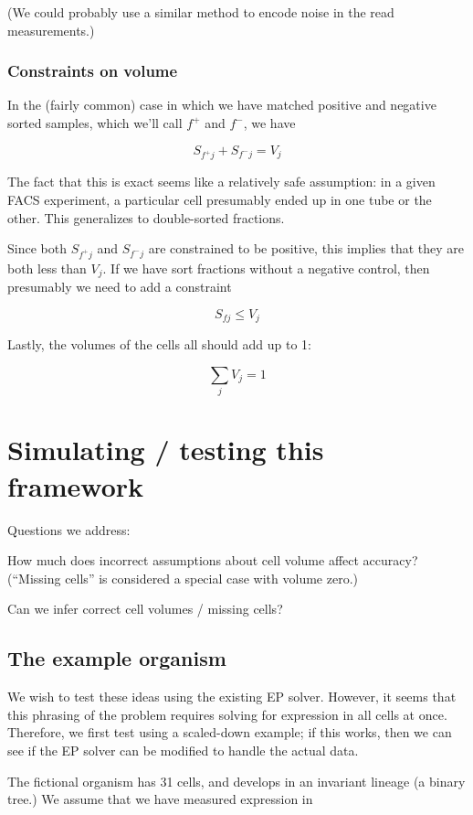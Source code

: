 \documentclass{article}
\begin{document}
(We could probably use a similar method to encode noise in the
read measurements.)

\subsubsection{Constraints on volume}

In the (fairly common) case in which we have matched positive and negative
sorted samples, which we'll call $f^+$ and $f^-$, we have

\[
S_{f^+j} + S_{f^-j} = V_j
\]

The fact that this is exact seems like a relatively safe assumption:
in a given FACS experiment, a particular cell presumably ended up
in one tube or the other.
This generalizes to double-sorted fractions.

Since both $S_{f^+j}$ and $S_{f^-j}$ are constrained to be positive,
this implies that they are both less than $V_j$. If we have sort fractions
without a negative control, then presumably we need to add a constraint

\[
S_{fj} \le V_j
\]

Lastly, the volumes of the cells all should add up to 1:

\[
\sum_j V_j = 1
\]



\section{Simulating / testing this framework}


Questions we address:

How much does incorrect assumptions about cell volume affect accuracy?
(``Missing cells'' is considered a special case with volume zero.)

Can we infer correct cell volumes / missing cells?



\subsection{The example organism}

We wish to test these ideas using the existing EP solver. However, it
seems that this phrasing of the problem requires solving for expression
in all cells at once. Therefore, we first test using a scaled-down example;
if this works, then we can see if the EP solver can be modified to handle
the actual data.

The fictional organism has 31 cells, and develops in an invariant lineage
(a binary tree.) We assume that we have measured expression in
\end{document}
